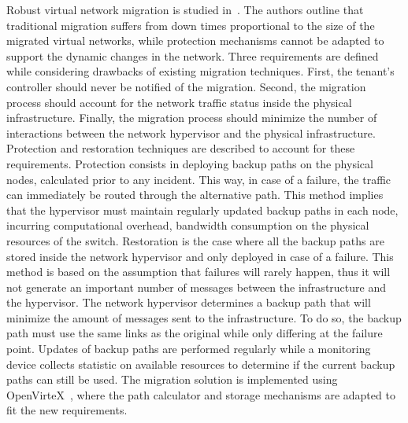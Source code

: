 Robust virtual network migration is studied in~\cite{Ko2017c}. The authors outline that traditional migration suffers from down times proportional to the size of the migrated virtual networks, while protection mechanisms cannot be adapted to support the dynamic changes in the network.
Three requirements are defined while considering drawbacks of existing migration techniques. 
First, the tenant's controller should never be notified of the migration.
Second, the migration process should account for the network traffic status inside the physical infrastructure.
Finally, the migration process should minimize the number of interactions between the network hypervisor and the physical infrastructure.
Protection and restoration techniques are described to account for these requirements.
Protection consists in deploying backup paths on the physical nodes, calculated prior to any incident.
This way, in case of a failure, the traffic can immediately be routed through the alternative path. 
This method implies that the hypervisor must maintain regularly updated backup paths in each node, incurring computational overhead, bandwidth consumption on the physical resources of the switch.
Restoration is the case where all the backup paths are stored inside the network hypervisor and only deployed in case of a failure.
This method is based on the assumption that failures will rarely happen, thus it will not generate an important number of messages between the infrastructure and the hypervisor.
The network hypervisor determines a backup path that will minimize the amount of messages sent to the infrastructure.
To do so, the backup path must use the same links as the original while only differing at the failure point.
Updates of backup paths are performed regularly while a monitoring device collects statistic on available resources to determine if the current backup paths can still be used.
The migration solution is implemented using OpenVirteX~\cite{OpenVirteX-Al-Shabibi2014}, where the path calculator and storage mechanisms are adapted to fit the new requirements. 

